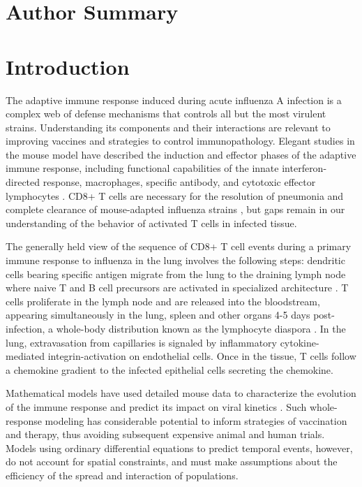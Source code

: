 \documentclass[10pt]{article}
\begin{document}
\section*{Author Summary}


\section*{Introduction}

The adaptive immune response induced during acute influenza A infection is a complex web of defense mechanisms that controls all but the most virulent strains.  Understanding its components and their interactions are relevant to improving vaccines and strategies to control immunopathology. Elegant studies in the mouse model have described the induction and effector phases of the adaptive immune response, including functional capabilities of the innate interferon-directed response, macrophages, specific antibody, and cytotoxic effector lymphocytes \cite{Sallusto2000, Joo2008, Mackay2008}.   CD8+ T cells are necessary for the resolution of pneumonia and complete clearance of mouse-adapted influenza strains \cite{Sallusto2000, Joo2008, Mackay2008, Miao2010}, but gaps remain in our understanding of the behavior of activated T cells in infected tissue.

The generally held view of the sequence of CD8+ T cell events during a primary immune response to influenza in the lung involves the following steps: dendritic cells bearing specific antigen migrate from the lung to the draining lymph node where naive T and B cell precursors are activated in specialized architecture \cite{Saenz2010, Beltman2007, Handel2008, Zheng2008, Ingulli2009, Allan1990}.  T cells proliferate in the lymph node and are released into the bloodstream, appearing simultaneously in the lung, spleen and other organs 4-5 days post-infection, a whole-body distribution known as the lymphocyte diaspora \cite{Thelen2008}.  In the lung, extravasation from capillaries is signaled by inflammatory cytokine-mediated integrin-activation on endothelial cells.  Once in the tissue, T cells follow a chemokine gradient to the infected epithelial cells secreting the chemokine.

Mathematical models have used detailed mouse data to characterize the evolution of the immune response and predict its impact on viral kinetics \cite{Thomas-Vaslin2008, Beauchemin2008, Smith2010, Thakar2010, Burrowes2004}.  Such whole-response modeling has considerable potential to inform strategies of vaccination and therapy, thus avoiding subsequent expensive animal and human trials.  Models using ordinary differential equations to predict temporal events, however, do not account for spatial constraints, and must make assumptions about the efficiency of the spread and interaction of populations. 
\end{document}
